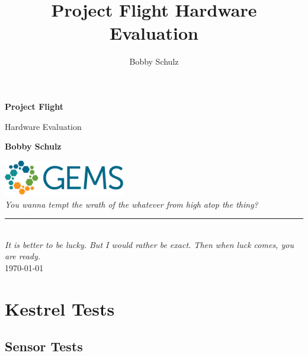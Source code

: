 \documentclass[10pt,letterpaper,titlepage]{report}
\author{Bobby Schulz}
\title{Project Flight Hardware Evaluation }
\begin{document}
%
%
\begin{titlepage}
\renewcommand*{\thepage}{Title}
   \begin{center}
       \vspace*{1cm}

       {\Huge \textbf{Project Flight}}

       \vspace{0.5cm}
        {\Large Hardware Evaluation}
            
       \vspace{1.5cm}

       {\large \textbf{Bobby Schulz}}

       \vfill
            
      
            
       \vspace{0.8cm}
     
       \includegraphics[width=0.4\textwidth]{GEMS-logo2d}\\
       \vspace{5cm}
		{\large \textit{You wanna tempt the wrath of the whatever from high atop the thing?}}\\[10pt]
		\rule{8cm}{0.15mm}\\[10pt]
		{\large \textit{It is better to be lucky. But I would rather be exact. Then when luck comes, you are ready.}}\\
       \vspace{2.4cm}
       \today
            
   \end{center}
\end{titlepage}

\tableofcontents
\pagebreak


\chapter{Kestrel Tests}
\section{Sensor Tests}

\end{document}

